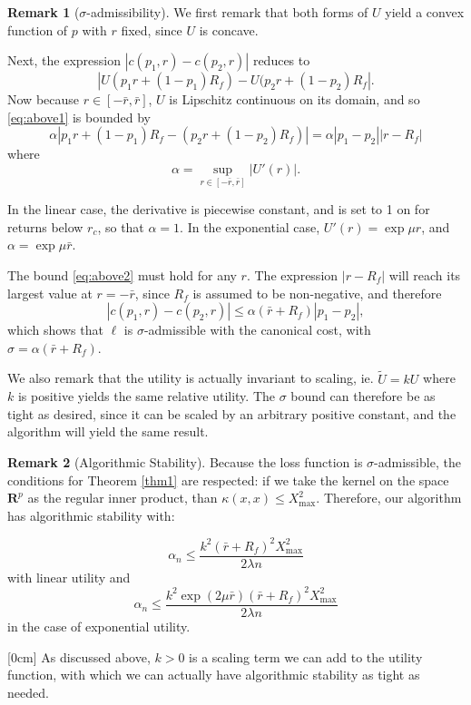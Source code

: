 \documentclass[11pt]{article}
\newcommand{\real}{\bm R}
\let\oldmarginnote\marginnote
\renewcommand{\marginnote}[1]{\oldmarginnote{\footnotesize\emph{#1}}[0cm]}
\theoremstyle{plain}
\theoremstyle{definition}
\newtheorem*{rem}{Remark}
\begin{document}
\begin{rem}[$\sigma$-admissibility]
  We first remark that both forms of $U$ yield a convex function of $p$ with $r$ fixed,
  since $U$ is concave. 

  Next, the expression $|c(p_1,r)-c(p_2,r)|$ reduces to
  \begin{equation}
    \label{eq:above1} |U(p_1r + (1-p_1)R_f) - U(p_2r + (1-p_2)R_f|.
  \end{equation} Now because $r\in[-\bar r,\bar r]$, $U$ is Lipschitz continuous on its
domain, and so \eqref{eq:above1} is bounded by
  \begin{equation}
    \label{eq:above2} \alpha |p_1r + (1-p_1)R_f - (p_2r + (1-p_2)R_f)| =
\alpha|p_1-p_2||r-R_f|
  \end{equation} where
  \begin{equation} \alpha = \sup_{r\in[-\bar r,\bar r]} |U'(r)|.
  \end{equation}

  In the linear case, the derivative is piecewise constant, and is set to 1 on for returns
below $r_c$, so that $\alpha=1$. In the exponential case, $U'(r) = \exp\mu r$, and $\alpha
= \exp \mu \bar r$.

  The bound \eqref{eq:above2} must hold for any $r$. The expression $|r-R_f|$ will reach
  its largest value at $r=-\bar r$, since $R_f$ is assumed to be non-negative, and
  therefore 
  \begin{equation}
    |c(p_1,r) - c(p_2,r)| \leq \alpha (\bar r + R_f)|p_1-p_2|,
  \end{equation}
  which shows that $\ell$ is $\sigma$-admissible with the canonical cost, with
  $\sigma=\alpha(\bar r+ R_f)$.

  We also remark that the utility is actually invariant to scaling, ie. $\tilde{U} = kU$
  where $k$ is positive yields the same relative utility. The $\sigma$ bound can therefore
  be as tight as desired, since it can be scaled by an arbitrary positive constant, and
  the algorithm will yield the same result.
\end{rem}

\begin{rem}[Algorithmic Stability]
  Because the loss function is $\sigma$-admissible, the conditions for Theorem \ref{thm1}
  are respected: if we take the kernel on the space $\real^p$ as the regular inner
  product, than $\kappa(x,x)\leq X^2_{\max}$. Therefore, our algorithm has algorithmic
  stability with:

  \begin{equation}
    \alpha_n \leq \frac{k^2(\bar r+R_f)^2X^2_{\max}}{2\lambda n}
  \end{equation}
  with linear utility and
  \begin{equation}
    \alpha_n \leq \frac{k^2 \exp(2\mu\bar r)(\bar r + R_f)^2 X^2_{\max}}{2\lambda n}
  \end{equation}
  in the case of exponential utility.

  \marginnote{How can we leverage $k$?}
  As discussed above, $k>0$ is a scaling term we can add to the utility function, with
  which we can actually have algorithmic stability as tight as needed. 
\end{rem}
\end{document}
